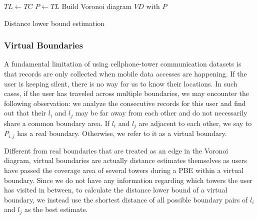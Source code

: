 \begin{algorithm}
 $TL \leftarrow TC$ \; 
 $P \leftarrow TL$ \;
 Build Voronoi diagram $VD$ with $P$ \;
 \caption{Distance lower bound estimation}\label{alg:DLB_estimation}
\end{algorithm}


\subsubsection{Virtual Boundaries}

A fundamental limitation of using cellphone-tower communication datasets is that records are only collected when mobile data accesses are happening. If the user is keeping silent, there is no way for us to know their locations. In such cases, if the user has traveled across multiple boundaries, we may encounter the following observation: we analyze the consecutive records for this user and find out that their $l_i$ and $l_j$  may be far away from each other and do not necessarily share a common boundary area. If $l_i$ and $l_j$ are adjacent to each other, we say to $P_{i,j}$ has a real boundary. Otherwise, we refer to it as a virtual boundary.

Different from real boundaries that are treated as an edge in the Voronoi diagram, virtual boundaries are actually distance estimates themselves as users have passed the coverage area of several towers during a PBE within a virtual boundary. Since we do not have any information regarding which towers the user has visited in between, to calculate the distance lower bound of a virtual boundary, we instead use the shortest distance of all possible boundary pairs of $l_i$ and $l_j$ as the best estimate.

